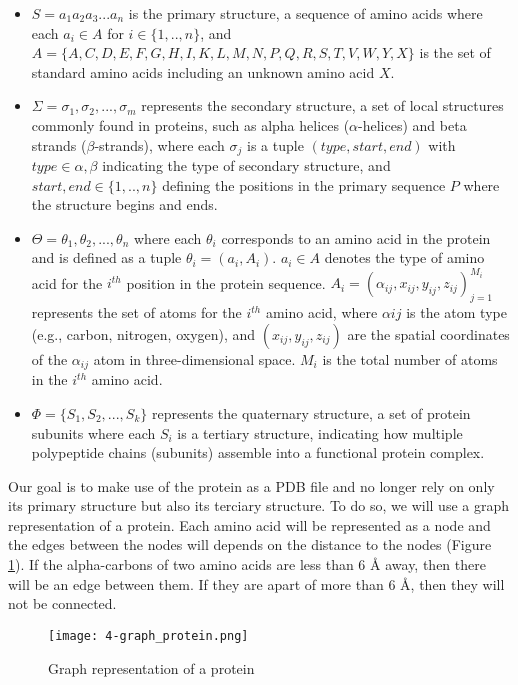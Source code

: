 \begin{itemize}
  \item $S=a_1a_2a_3...a_n$ is the primary structure, a sequence of amino acids where each 
  $a_i \in A$ for $i \in \{1,..,n\}$, and $A=\{A,C,D,E,F,G,H,I,K,L,M,N,P,Q,R,S,T,V,W,Y,X\}$ is the set of 
  standard amino acids including an unknown amino acid $X$.
  \item $\Sigma = {\sigma_1, \sigma_2, ..., \sigma_m}$ represents the secondary structure, a set of 
  local structures commonly found in proteins, such as alpha helices ($\alpha$-helices) and 
  beta strands ($\beta$-strands), where each $\sigma_j$ is a tuple $(type, start, end)$ 
  with $type \in {\alpha, \beta}$ indicating the type of secondary structure, and $start, end \in \{1,..,n\}$ 
  defining the positions in the primary sequence $P$ where the structure begins and ends.
  \item $\Theta = {\theta_1, \theta_2, ..., \theta_n}$ where each $\theta_i$ corresponds to an amino acid 
  in the protein and is defined as a tuple $\theta_i = (a_i, A_i)$. $a_i \in A$ denotes the type of amino acid for 
  the $i^{th}$ position in the protein sequence. $A_i = {(\alpha_{ij}, x_{ij}, y_{ij}, z_{ij})}_{j=1}^{M_i}$ 
  represents the set of atoms for the $i^{th}$ amino acid, where $\alpha{ij}$ is the atom type 
  (e.g., carbon, nitrogen, oxygen), and $(x_{ij}, y_{ij}, z_{ij})$ are the spatial coordinates of 
  the $\alpha_{ij}$ atom in three-dimensional space. $M_i$ is the total number of atoms 
  in the $i^{th}$ amino acid.
  \item $\Phi = \{S_1, S_2, ..., S_k\}$ represents the quaternary structure, a set of protein subunits where 
  each $S_i$ is a tertiary structure, indicating how multiple polypeptide chains (subunits) 
  assemble into a functional protein complex.
\end{itemize}

Our goal is to make use of the protein as a PDB file and no longer rely on only its primary structure but 
also its terciary structure. To do so, we will use a graph representation of a protein. Each amino acid will
be represented as a node and the edges between the nodes will depends on the distance to the nodes (Figure \ref{fig:graphprot}). If the
alpha-carbons of two amino acids are less than 6 {\AA} away, then there will be an edge between them. 
If they are apart of more than 6 {\AA}, then they will not be connected. 

\begin{figure}
  \centering
  \texttt{[image: 4-graph\_protein.png]}
  \caption{Graph representation of a protein}
  \label{fig:graphprot}
\end{figure}


